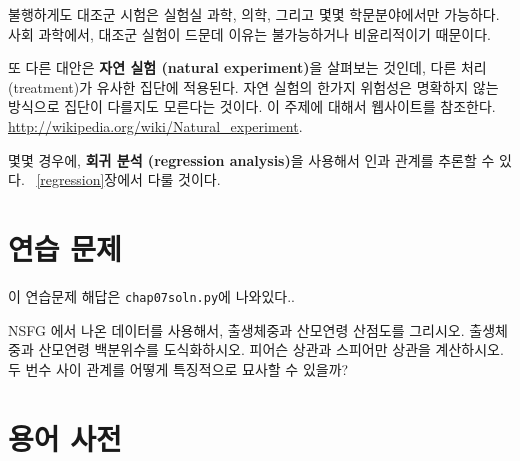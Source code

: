 불행하게도 대조군 시험은 실험실 과학, 의학, 그리고 몇몇 학문분야에서만 가능하다. 사회 과학에서, 대조군 실험이 드문데 이유는 불가능하거나 비윤리적이기 때문이다.

또 다른 대안은 {\bf 자연 실험 (natural experiment)}을 살펴보는 것인데, 다른 처리(treatment)가 유사한 집단에 적용된다. 자연 실험의 한가지 위험성은 명확하지 않는 방식으로 집단이 다를지도 모른다는 것이다.
이 주제에 대해서 웹사이트를 참조한다. \url{http://wikipedia.org/wiki/Natural_experiment}.

몇몇 경우에, {\bf 회귀 분석 (regression analysis)}을 사용해서 인과 관계를 추론할 수 있다. ~\ref{regression}장에서 다룰 것이다.


\section{연습 문제}

이 연습문제 해답은 \verb"chap07soln.py"에 나와있다..

\begin{exercise}
NSFG 에서 나온 데이터를 사용해서,
출생체중과 산모연령 산점도를 그리시오.
출생체중과 산모연령 백분위수를 도식화하시오.
피어슨 상관과 스피어만 상관을 계산하시오.
두 번수 사이 관계를 어떻게 특징적으로 묘사할 수 있을까?
\end{exercise}


\section{용어 사전}


